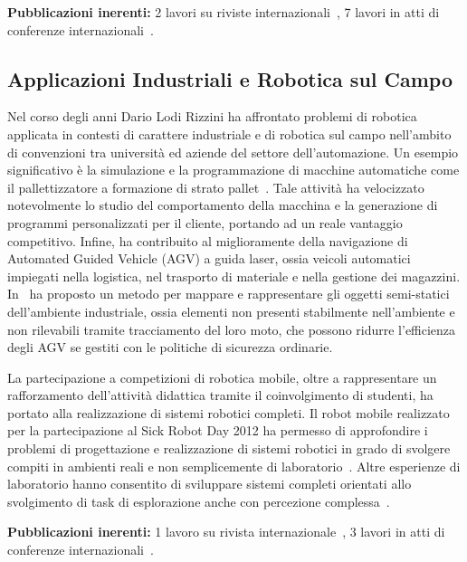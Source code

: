 \documentclass[11pt]{article}
\begin{document}
\textbf{Pubblicazioni inerenti:}
2 lavori su riviste internazionali~\cite{aleotti2014jirs,lodirizzini2015ijars},
7 lavori in atti di conferenze internazionali~\cite{aleotti2012icra,oleari2013iccp,
lodirizzini2014ias,aleotti2014iros,kallasi2015oceans,oleari2015oceans}.

\subsection*{Applicazioni Industriali e Robotica sul Campo}

Nel corso degli anni Dario Lodi Rizzini ha affrontato problemi di robotica applicata in contesti 
di carattere industriale e di robotica sul campo nell'ambito di convenzioni tra universit\`a 
ed aziende del settore dell'automazione. 
Un esempio significativo \`e la simulazione e la programmazione di macchine automatiche 
come il pallettizzatore a formazione di strato pallet~\cite{argenti2010isr,calo2012icinco}. 
Tale attivit\`a ha velocizzato notevolmente lo studio del comportamento della macchina e 
la generazione di programmi personalizzati per il cliente, portando ad un reale vantaggio 
competitivo. 
Infine, ha contribuito al miglioramente della navigazione di Automated Guided Vehicle (AGV)
a guida laser, ossia veicoli automatici impiegati nella logistica, nel trasporto di materiale
e nella gestione dei magazzini. 
In~\cite{lodirizzini2007icinco} ha proposto un metodo per mappare e rappresentare gli 
oggetti semi-statici dell'ambiente industriale, ossia elementi non presenti stabilmente 
nell'ambiente e non rilevabili tramite tracciamento del loro moto, che possono ridurre 
l'efficienza degli AGV se gestiti con le politiche di sicurezza ordinarie. 

La partecipazione a competizioni di robotica mobile, oltre a rappresentare un 
rafforzamento dell'attivit\`a didattica tramite il coinvolgimento di studenti, 
ha portato alla realizzazione di sistemi robotici completi. 
Il robot mobile realizzato per la partecipazione al Sick Robot Day 2012 ha permesso 
di approfondire i problemi di progettazione e realizzazione di sistemi robotici 
in grado di svolgere compiti in ambienti reali e non semplicemente di laboratorio~\cite{cigolini2014jamris}. 
Altre esperienze di laboratorio hanno consentito di sviluppare sistemi completi 
orientati allo svolgimento di task di esplorazione anche con percezione complessa~\cite{valeriani2013acra}.


\textbf{Pubblicazioni inerenti:}
1 lavoro su rivista internazionale~\cite{cigolini2014jamris},
3 lavori in atti di conferenze internazionali~\cite{valeriani2013acra,lodirizzini2012icinco,calo2012icinco,argenti2010isr}.
\end{document}
